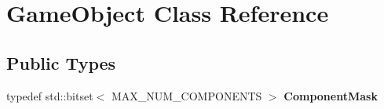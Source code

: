 \hypertarget{classGameObject}{}\section{Game\+Object Class Reference}
\label{classGameObject}
\subsection*{Public Types}
\begin{DoxyCompactItemize}
\item 
\mbox{\label{classGameObject_aec670daa4bbc9e2956937b0b1b55acbe}} 
typedef std\+::bitset$<$ M\+A\+X\+\_\+\+N\+U\+M\+\_\+\+C\+O\+M\+P\+O\+N\+E\+N\+TS $>$ {\bfseries Component\+Mask}
\end{DoxyCompactItemize}
